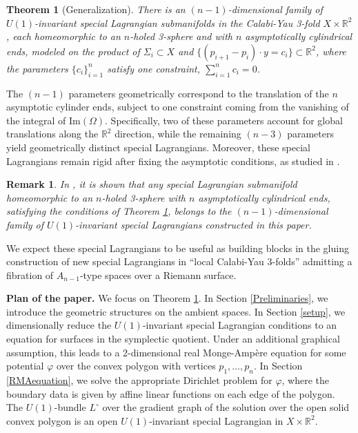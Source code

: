 \documentclass[11pt]{article}
\newtheorem{theorem}{Theorem}
\newtheorem{remark}{Remark}
\begin{document}
\begin{theorem}[Generalization] \label{generalizationDonaldsonScaduto}  There is an $(n-1)$-dimensional family of $U(1)$-invariant special Lagrangian submanifolds in the Calabi-Yau 3-fold $X\times \mathbb{R}^2$, each homeomorphic to an $n$-holed 3-sphere and with $n$ asymptotically cylindrical ends, modeled on the product of $\Sigma_i\subset X$ and $\{ (p_{i+1}-p_i) \cdot y= c_i   \} \subset \mathbb{R}^2$, 
 where the parameters $\{c_i\}_{i=1}^n$ satisfy one constraint, $\sum_{i=1}^n c_i=0$.
\end{theorem}

The $(n-1)$ parameters geometrically correspond to the translation of the $n$ asymptotic cylinder ends, subject to one constraint coming from the vanishing of the integral of $\text{Im}(\Omega)$. Specifically, two of these parameters account for global translations along the $\mathbb{R}^2$ direction, while the remaining $(n-3)$ parameters yield geometrically distinct special Lagrangians. Moreover, these special Lagrangians remain rigid after fixing the asymptotic conditions, as studied in \cite[Theorem 43.]{MR4495257}.

\begin{remark}
\emph{
In \cite[Theorem 1]{MR4945554}, it is shown that any special Lagrangian submanifold homeomorphic to an $n$-holed 3-sphere with $n$ asymptotically cylindrical ends, satisfying the conditions of Theorem \ref{generalizationDonaldsonScaduto}, belongs to the $(n-1)$-dimensional family of $U(1)$-invariant special Lagrangians constructed in this paper.}
\end{remark}

We expect these special Lagrangians to be useful as building blocks in the gluing construction of new special Lagrangians in ``local Calabi-Yau 3-folds'' admitting a fibration of $A_{n-1}$-type spaces over a Riemann surface. 

\vspace{5pt} 


\textbf{Plan of the paper.} 
We focus on Theorem \ref{generalizationDonaldsonScaduto}. In Section \ref{Preliminaries}, we introduce the geometric structures on the ambient spaces. In Section \ref{setup}, we dimensionally reduce the $U(1)$-invariant special Lagrangian conditions to an equation for surfaces in the symplectic quotient. Under an additional graphical assumption, this leads to a 2-dimensional real Monge-Amp\`ere equation for some potential $\varphi$ over the convex polygon with vertices $p_1,\ldots, p_n$. In Section \ref{RMAequation}, we solve the appropriate Dirichlet problem for $\varphi$, where the boundary data is given by affine linear functions on each edge of the polygon. The $U(1)$-bundle $L^{\circ}$ over the gradient graph of the solution over the open solid convex polygon is an open $U(1)$-invariant special Lagrangian in $X \times \mathbb{R}^2$. 
\end{document}
